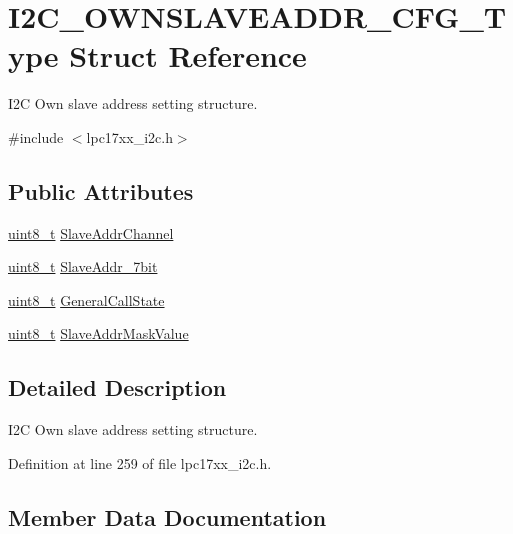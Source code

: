 \hypertarget{struct_i2_c___o_w_n_s_l_a_v_e_a_d_d_r___c_f_g___type}{}\section{I2\+C\+\_\+\+O\+W\+N\+S\+L\+A\+V\+E\+A\+D\+D\+R\+\_\+\+C\+F\+G\+\_\+\+Type Struct Reference}
\label{struct_i2_c___o_w_n_s_l_a_v_e_a_d_d_r___c_f_g___type}


I2C Own slave address setting structure.  




{\ttfamily \#include $<$lpc17xx\+\_\+i2c.\+h$>$}

\subsection*{Public Attributes}
\begin{DoxyCompactItemize}
\item 
\hyperlink{_p_e___types_8h_aba7bc1797add20fe3efdf37ced1182c5}{uint8\+\_\+t} \hyperlink{struct_i2_c___o_w_n_s_l_a_v_e_a_d_d_r___c_f_g___type_a837b455a7cd6e12fc75175e4a3eebe7d}{Slave\+Addr\+Channel}
\item 
\hyperlink{_p_e___types_8h_aba7bc1797add20fe3efdf37ced1182c5}{uint8\+\_\+t} \hyperlink{struct_i2_c___o_w_n_s_l_a_v_e_a_d_d_r___c_f_g___type_a68d407a41be44644ce3ee911f59bc870}{Slave\+Addr\+\_\+7bit}
\item 
\hyperlink{_p_e___types_8h_aba7bc1797add20fe3efdf37ced1182c5}{uint8\+\_\+t} \hyperlink{struct_i2_c___o_w_n_s_l_a_v_e_a_d_d_r___c_f_g___type_a7854696cf45e880ce3602d3c020fcdb5}{General\+Call\+State}
\item 
\hyperlink{_p_e___types_8h_aba7bc1797add20fe3efdf37ced1182c5}{uint8\+\_\+t} \hyperlink{struct_i2_c___o_w_n_s_l_a_v_e_a_d_d_r___c_f_g___type_ad7ade56e1eca1d7c2206ea2c81d2e9f6}{Slave\+Addr\+Mask\+Value}
\end{DoxyCompactItemize}


\subsection{Detailed Description}
I2C Own slave address setting structure. 

Definition at line 259 of file lpc17xx\+\_\+i2c.\+h.



\subsection{Member Data Documentation}
